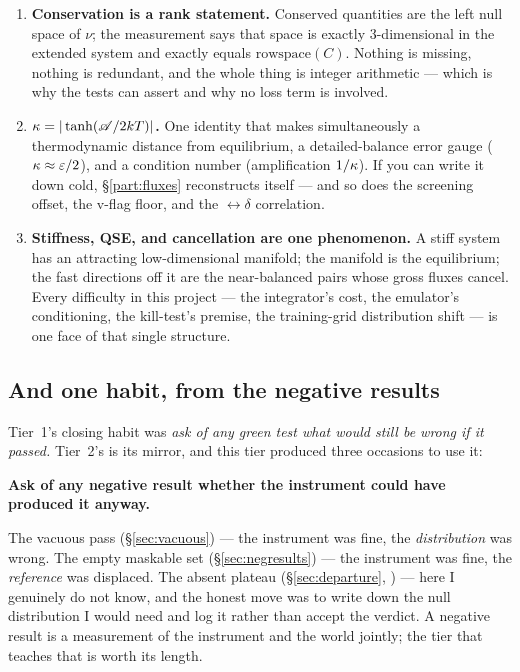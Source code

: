 \begin{enumerate}
\item \textbf{Conservation is a rank statement.} Conserved quantities are the
  left null space of $\nu$; the measurement says that space is exactly
  3-dimensional in the extended system and exactly equals $\mathrm{rowspace}(C)$.
  Nothing is missing, nothing is redundant, and the whole thing is integer
  arithmetic --- which is why the tests can assert  and why no loss
  term is involved.
\item \textbf{$\kappa = |\tanh(\mathscr{A}/2kT)|$.} One identity that makes \kap{}
  simultaneously a thermodynamic distance from equilibrium, a detailed-balance
  error gauge ($\kappa \approx \varepsilon/2$), and a condition number
  (amplification $1/\kappa$). If you can write it down cold,
  \S\ref{part:fluxes} reconstructs itself --- and so does the screening offset,
  the v-flag floor, and the \kap$\leftrightarrow\delta$ correlation.
\item \textbf{Stiffness, QSE, and cancellation are one phenomenon.} A stiff
  system has an attracting low-dimensional manifold; the manifold is the
  equilibrium; the fast directions off it are the near-balanced pairs whose
  gross fluxes cancel. Every difficulty in this project --- the integrator's
  cost, the emulator's conditioning, the kill-test's premise, the training-grid
  distribution shift --- is one face of that single structure.
\end{enumerate}

\subsection*{And one habit, from the negative results}
\label{sec:habit-negative}

Tier~1's closing habit was \emph{ask of any green test what would still be wrong
if it passed.} Tier~2's is its mirror, and this tier produced three occasions to
use it:

\begin{invariant}
\textbf{Ask of any negative result whether the instrument could have produced it
anyway.}
\end{invariant}

The vacuous \kap{} pass (\S\ref{sec:vacuous}) --- the instrument was fine, the
\emph{distribution} was wrong. The empty maskable set (\S\ref{sec:negresults})
--- the instrument was fine, the \emph{reference} was displaced. The absent
\rQSE{} plateau (\S\ref{sec:departure}, ) --- here I genuinely do not
know, and the honest move was to write down the null distribution I would need
and log it rather than accept the verdict. A negative result is a measurement of
the instrument and the world jointly; the tier that teaches that is worth its
length.

